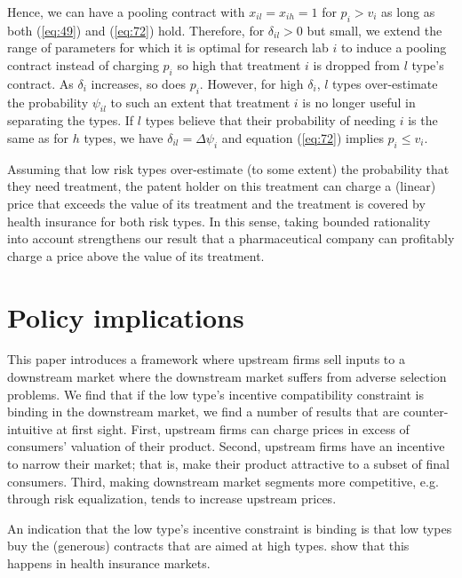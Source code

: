 \documentclass[12pt,english,a4paper]{article}
\begin{document}
Hence, we can have a pooling contract with \(x_{il}=x_{ih}=1\) for \(p_i>v_i\) as long as both (\ref{eq:49}) and (\ref{eq:72}) hold. Therefore, for \(\delta_{il} > 0\) but small, we extend the range of parameters for which it is optimal for research lab \(i\) to induce a pooling contract instead of charging \(p_i\) so high that treatment \(i\) is dropped from \(l\) type's contract. As \(\delta_i\) increases, so does \(p_i\). However, for high \(\delta_i\), \(l\) types over-estimate the probability \(\psi_{il}\) to such an extent that treatment \(i\) is no longer useful in separating the types. If \(l\) types believe that their probability of needing \(i\) is the same as for \(h\) types, we have \(\delta_{il} = \Delta \psi_i\) and equation (\ref{eq:72}) implies \(p_i \leq v_i\).

Assuming that low risk types over-estimate (to some extent) the probability that they need treatment, the patent holder on this treatment can charge a (linear) price that exceeds the value of its treatment and the treatment is covered by health insurance for both risk types. In this sense, taking bounded rationality into account strengthens our result that a pharmaceutical company can profitably charge a price above the value of its treatment.

\section{Policy implications}
\label{sec:org05eaa2a}

This paper introduces a framework where upstream firms sell inputs to a downstream market where the downstream market suffers from adverse selection problems. We find that if the low type's incentive compatibility constraint is binding in the downstream market, we find a number of results that are counter-intuitive at first sight. First, upstream firms can charge prices in excess of consumers' valuation of their product. Second, upstream firms have an incentive to narrow their market; that is, make their product attractive to a subset of final consumers. Third, making downstream market segments more competitive, e.g. through risk equalization, tends to increase upstream prices.

An indication that the low type's incentive constraint is binding is that low types buy the (generous) contracts that are aimed at high types. \cite{handel-2015-healt-insur-human} show that this happens in health insurance markets. 
\end{document}
